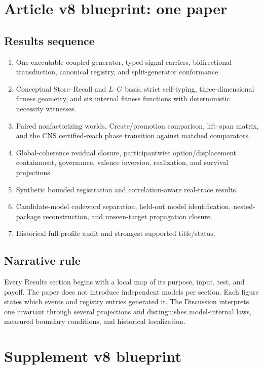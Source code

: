 \documentclass[11pt]{article}
\begin{document}
\section{Article v8 blueprint: one paper}

\subsection{Results sequence}

\begin{enumerate}
\item One executable coupled generator, typed signal carriers, bidirectional transduction, canonical registry, and split-generator conformance.
\item Conceptual Store--Recall and $L$--$G$ basis, strict self-typing, three-dimensional fitness geometry, and six internal fitness functions with deterministic necessity witnesses.
\item Paired nonfactorizing worlds, Create/promotion comparison, lift--span matrix, and the CNS certified-reach phase transition against matched comparators.
\item Global-coherence residual closure, participantwise option/displacement containment, governance, valence inversion, realization, and survival projections.
\item Synthetic bounded registration and correlation-aware real-trace results.
\item Candidate-model codeword separation, held-out model identification, nested-package reconstruction, and unseen-target propagation closure.
\item Historical full-profile audit and strongest supported title/status.
\end{enumerate}

\subsection{Narrative rule}

Every Results section begins with a local map of its purpose, input, test, and payoff. The paper does not introduce independent models per section. Each figure states which events and registry entries generated it. The Discussion interprets one invariant through several projections and distinguishes model-internal laws, measured boundary conditions, and historical localization.

\section{Supplement v8 blueprint}
\end{document}
